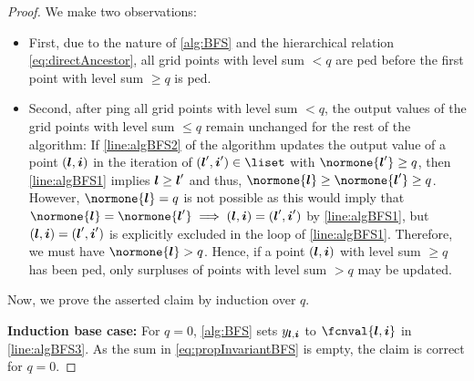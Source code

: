 \begin{proof}
  We make two observations:
  
  \begin{itemize}
    \item
    First, due to the \bfs nature of \cref{alg:BFS} and the
    hierarchical relation \eqref{eq:directAncestor},
    all grid points with level sum $< q$ are \pop{}ped before
    the first point with level sum $\ge q$ is \pop{}ped.
    
    \item
    Second, after \pop{}ping all grid points with
    level sum $< q$, the output values of the grid points with
    level sum $\le q$ remain unchanged for the rest of the algorithm:
    If \cref{line:algBFS2} of the algorithm updates the output value of a point
    $({\boldsymbol{l}}, {\boldsymbol{i}})$ in the iteration of $(\*l', \*i') \in \liset$ with
    $\normone{\*l'} \ge q$, then \cref{line:algBFS1} implies
    ${\boldsymbol{l}} \ge {\boldsymbol{l}}'$ and thus, $\normone{\*l} \ge \normone{\*l'} \ge q$.
    However, $\normone{\*l} = q$ is not possible as
    this would imply that $\normone{\*l} = \normone{\*l'}
    \implies (\*l, \*i) = (\*l', \*i')$ by \cref{line:algBFS1},
    but $({\boldsymbol{l}}, {\boldsymbol{i}}) = ({\boldsymbol{l}}', {\boldsymbol{i}}')$ is explicitly excluded in the
    \texttt{\algorithmicfor} loop of \cref{line:algBFS1}.
    Therefore, we must have $\normone{\*l} > q$.
    Hence, if a point $({\boldsymbol{l}}, {\boldsymbol{i}})$ with level sum $\ge q$ has been \pop{}ped,
    only surpluses of points with level sum $> q$ may be updated.
  \end{itemize}
  
  \noindent
  Now, we prove the asserted claim by induction over $q$.
  
  \noindent
  \textbf{Induction base case:}
  For $q = 0$, \cref{alg:BFS} sets $\linout{\*l,\*i}$ to
  $\fcnval{\*l,\*i}$ in \cref{line:algBFS3}.
  As the sum in \eqref{eq:propInvariantBFS} is empty,
  the claim is correct for $q = 0$.
  

\end{proof}
